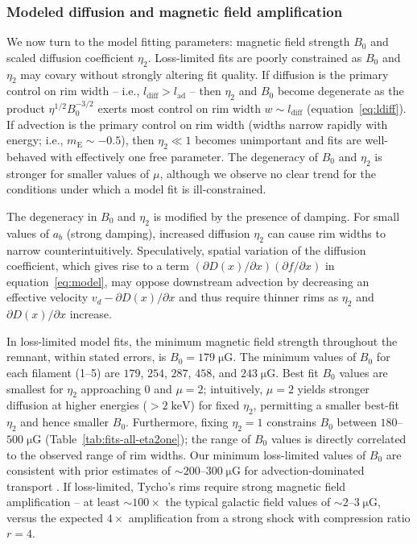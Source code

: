 \documentclass[iop, apj, numberedappendix]{emulateapj}
\newcommand*{\mt}{\mathrm}
\newcommand*{\unit}[1]{\;\mt{#1}}  %
\newcommand*{\abt}{\mathord{\sim}} %
\newcommand*{\ptl}{\partial}
\newcommand*{\mE}{m_\mt{E}}
\newcommand*{\muG}{\unit{\mu G}}
\begin{document}
\subsubsection{Modeled diffusion and magnetic field amplification}

We now turn to the model fitting parameters: magnetic field strength $B_0$ and
scaled diffusion coefficient $\eta_2$.  Loss-limited fits are poorly
constrained as $B_0$ and $\eta_2$ may covary without strongly altering fit
quality.  If diffusion is the primary control on rim width -- i.e.,
$l_{\mt{diff}} > l_{\mt{ad}}$ -- then $\eta_2$ and $B_0$ become degenerate as
the product $\eta^{1/2} B_0^{-3/2}$ exerts most control on rim width $w \sim
l_{\mt{diff}}$ (equation~\eqref{eq:ldiff}).  If advection is the primary
control on rim width (widths narrow rapidly with energy; i.e., $\mE \sim
-0.5$), then $\eta_2 \ll 1$ becomes unimportant and fits are well-behaved with
effectively one free parameter.  The degeneracy of $B_0$ and $\eta_2$ is
stronger for smaller values of $\mu$, although we observe no clear trend for
the conditions under which a model fit is ill-constrained.

The degeneracy in $B_0$ and $\eta_2$ is modified by the presence of damping.
For small values of $a_b$ (strong damping), increased diffusion $\eta_2$ can
cause rim widths to narrow counterintuitively.  Speculatively, spatial
variation of the diffusion coefficient, which gives rise to a
term $(\ptl D(x) / \ptl x) (\ptl f/\ptl x)$ in equation~\eqref{eq:model}, may
oppose downstream advection by decreasing an effective velocity $v_d - \ptl
D(x) / \ptl x$ and thus require thinner rims as $\eta_2$ and $\ptl D(x) / \ptl
x$ increase.

In loss-limited model fits, the minimum magnetic field strength throughout the
remnant, within stated errors, is $B_0 = 179 \muG$.  The minimum values of
$B_0$ for each filament (1--5) are $179$, $254$, $287$, $458$, and $243 \muG$.
Best fit $B_0$ values are smallest for $\eta_2$ approaching $0$ and $\mu =
2$; intuitively, $\mu = 2$ yields stronger diffusion at higher energies
($>2\unit{keV}$) for fixed $\eta_2$, permitting a smaller best-fit $\eta_2$ and
hence smaller $B_0$.  Furthermore, fixing $\eta_2 = 1$ constrains $B_0$ between
$180$--$500 \muG$ (Table~\ref{tab:fits-all-eta2one}); the range of $B_0$ values
is directly correlated to the observed range of rim widths.  Our minimum
loss-limited values of $B_0$ are consistent with prior estimates of $\abt
200$--$300 \muG$ for advection-dominated transport \citep{volk2005,
parizot2006, morlino2012}.  If loss-limited, Tycho's rims require strong
magnetic field amplification -- at least $\abt 100\times$ the typical galactic
field values of $\abt 2$--$3 \muG$, versus the expected $4\times$ amplification
from a strong shock with compression ratio $r=4$.
\end{document}
